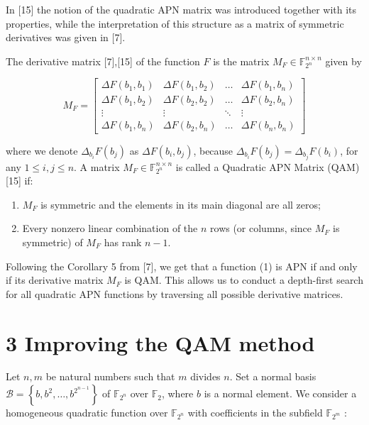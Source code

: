 \documentclass[10pt]{article}
\begin{document}
In [15] the notion of the quadratic APN matrix was introduced together with its properties, while the interpretation of this structure as a matrix of symmetric derivatives was given in [7].

The derivative matrix [7],[15] of the function $F$ is the matrix $M_{F} \in \mathbb{F}_{2^{n}}^{n \times n}$ given by

\[
M_{F}=\left[\begin{array}{cccc}
\Delta F\left(b_{1}, b_{1}\right) & \Delta F\left(b_{1}, b_{2}\right) & \ldots & \Delta F\left(b_{1}, b_{n}\right)  \tag{3}\\
\Delta F\left(b_{1}, b_{2}\right) & \Delta F\left(b_{2}, b_{2}\right) & \ldots & \Delta F\left(b_{2}, b_{n}\right) \\
\vdots & \vdots & \ddots & \vdots \\
\Delta F\left(b_{1}, b_{n}\right) & \Delta F\left(b_{2}, b_{n}\right) & \ldots & \Delta F\left(b_{n}, b_{n}\right)
\end{array}\right]
\]

where we denote $\Delta_{b_{i}} F\left(b_{j}\right)$ as $\Delta F\left(b_{i}, b_{j}\right)$, because $\Delta_{b_{i}} F\left(b_{j}\right)=\Delta_{b_{j}} F\left(b_{i}\right)$, for any $1 \leq i, j \leq n$. A matrix $M_{F} \in \mathbb{F}_{2^{n}}^{n \times n}$ is called a Quadratic APN Matrix (QAM) [15] if:

\begin{enumerate}
  \item $M_{F}$ is symmetric and the elements in its main diagonal are all zeros;
  \item Every nonzero linear combination of the $n$ rows (or columns, since $M_{F}$ is symmetric) of $M_{F}$ has rank $n-1$.
\end{enumerate}

Following the Corollary 5 from [7], we get that a function (1) is APN if and only if its derivative matrix $M_{F}$ is QAM. This allows us to conduct a depth-first search for all quadratic APN functions by traversing all possible derivative matrices.

\section*{3 Improving the QAM method}
Let $n, m$ be natural numbers such that $m$ divides $n$. Set a normal basis $\mathcal{B}=\left\{b, b^{2}, \ldots, b^{2^{n-1}}\right\}$ of $\mathbb{F}_{2^{n}}$ over $\mathbb{F}_{2}$, where $b$ is a normal element. We consider a homogeneous quadratic function over $\mathbb{F}_{2^{n}}$ with coefficients in the subfield $\mathbb{F}_{2^{m}}$ :
\end{document}
